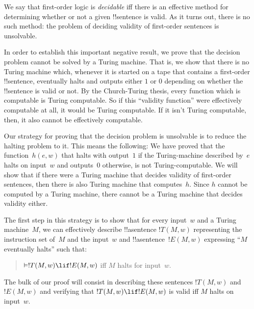 \documentclass[../../../include/open-logic-section]{subfiles}
\begin{document}

We say that first-order logic is \emph{decidable} iff there is an
effective method for determining whether or not a given !!{sentence}
is valid. As it turns out, there is no such method: the problem of
deciding validity of first-order sentences is unsolvable.

In order to establish this important negative result, we prove that
the decision problem cannot be solved by a Turing machine.  That is,
we show that there is no Turing machine which, whenever it is started
on a tape that contains a first-order !!{sentence}, eventually halts
and outputs either $1$ or $0$ depending on whether the
!!{sentence} is valid or not. By the Church-Turing thesis, every
function which is computable is Turing computable. So if this
``validity function'' were effectively computable at all, it would be
Turing computable. If it isn't Turing computable, then, it also cannot
be effectively computable.

Our strategy for proving that the decision problem is unsolvable is to
reduce the halting problem to it.  This means the following: We have
proved that the function~$h(e,w)$ that halts with output~$1$ if the
Turing-machine described by~$e$ halts on input~$w$ and outputs~$0$
otherwise, is not Turing-computable.  We will show that if there were
a Turing machine that decides validity of first-order sentences, then
there is also Turing machine that computes~$h$.  Since $h$ cannot be
computed by a Turing machine, there cannot be a Turing machine that
decides validity either.

The first step in this strategy is to show that for every input~$w$
and a Turing machine~$M$, we can effectively describe !!a{sentence}
$!T(M, w)$ representing the instruction set of~$M$ and the input~$w$
and !!a{sentence}~$!E(M, w)$ expressing ``$M$ eventually halts'' such
that:
\begin{quote}
  $\Entails !T(M, w) \lif !E(M,w)$ iff $M$ halts for input~$w$.
\end{quote}
The bulk of our proof will consist in describing these sentences
$!T(M, w)$ and $!E(M, w)$ and verifying that $!T(M, w) \lif !E(M, w)$
is valid iff $M$ halts on input~$w$.
\end{document}
